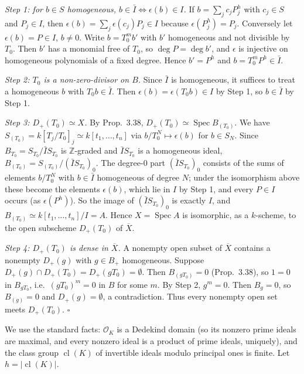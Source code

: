 \documentclass[11pt]{article}
\begin{document}
\emph{Step 1: for $b\in S$ homogeneous, $b\in\bar I\iff\epsilon(b)\in I$.} If $b=\sum_jc_jP_j^h$ with $c_j\in S$ and $P_j\in I$, then $\epsilon(b)=\sum_j\epsilon(c_j)P_j\in I$ because $\epsilon(P_j^h)=P_j$. Conversely let $\epsilon(b)=P\in I$, $b\ne0$. Write $b=T_0^mb'$ with $b'$ homogeneous and not divisible by $T_0$. Then $b'$ has a monomial free of $T_0$, so $\deg P=\deg b'$, and $\epsilon$ is injective on homogeneous polynomials of a fixed degree. Hence $b'=P^h$ and $b=T_0^mP^h\in\bar I$.

\emph{Step 2: $T_0$ is a non-zero-divisor on $B$.} Since $\bar I$ is homogeneous, it suffices to treat a homogeneous $b$ with $T_0b\in\bar I$. Then $\epsilon(b)=\epsilon(T_0b)\in I$ by Step 1, so $b\in\bar I$ by Step 1.

\emph{Step 3: $D_+(T_0)\simeq X$.} By Prop.~3.38, $D_+(T_0)\simeq\operatorname{Spec}B_{(T_0)}$. We have $S_{(T_0)}=k[T_j/T_0]_{j}\simeq k[t_1,\dots,t_n]$ via $b/T_0^N\mapsto\epsilon(b)$ for $b\in S_N$. Since $B_{T_0}=S_{T_0}/\bar IS_{T_0}$ is $\mathbb{Z}$-graded and $\bar IS_{T_0}$ is a homogeneous ideal, $B_{(T_0)}=S_{(T_0)}/(\bar IS_{T_0})_0$. The degree-$0$ part $(\bar IS_{T_0})_0$ consists of the sums of elements $b/T_0^N$ with $b\in\bar I$ homogeneous of degree $N$; under the isomorphism above these become the elements $\epsilon(b)$, which lie in $I$ by Step 1, and every $P\in I$ occurs (as $\epsilon(P^h)$). So the image of $(\bar IS_{T_0})_0$ is exactly $I$, and $B_{(T_0)}\simeq k[t_1,\dots,t_n]/I=A$. Hence $X=\operatorname{Spec}A$ is isomorphic, as a $k$-scheme, to the open subscheme $D_+(T_0)$ of $\overline X$.

\emph{Step 4: $D_+(T_0)$ is dense in $\overline X$.} A nonempty open subset of $\overline X$ contains a nonempty $D_+(g)$ with $g\in B_+$ homogeneous. Suppose $D_+(g)\cap D_+(T_0)=D_+(gT_0)=\emptyset$. Then $B_{(gT_0)}=0$ (Prop.~3.38), so $1=0$ in $B_{gT_0}$, i.e.\ $(gT_0)^m=0$ in $B$ for some $m$. By Step 2, $g^m=0$. Then $B_g=0$, so $B_{(g)}=0$ and $D_+(g)=\emptyset$, a contradiction. Thus every nonempty open set meets $D_+(T_0)$. \hfill$\square$

\pf
We use the standard facts: $\mathcal{O}_K$ is a Dedekind domain (so its nonzero prime ideals are maximal, and every nonzero ideal is a product of prime ideals, uniquely), and the class group $\operatorname{cl}(K)$ of invertible ideals modulo principal ones is finite. Let $h=|\operatorname{cl}(K)|$.
\end{document}
